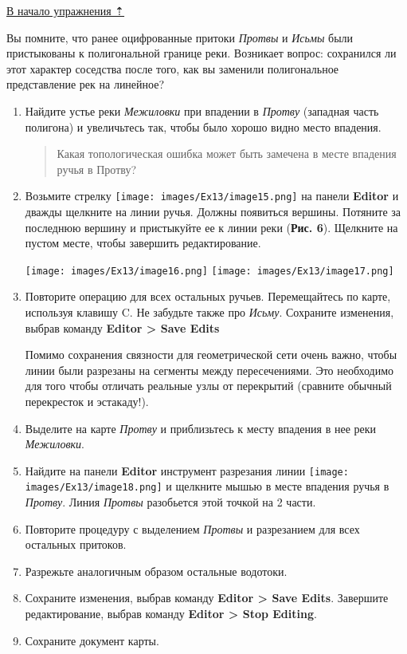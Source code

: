 \documentclass[12pt,]{book}
\begin{document}
\protect\hyperlink{network-hydro}{В начало упражнения ⇡}

Вы помните, что ранее оцифрованные притоки \emph{Протвы} и \emph{Исьмы} были пристыкованы к полигональной границе реки. Возникает вопрос: сохранился ли этот характер соседства после того, как вы заменили полигональное представление рек на линейное?

\begin{enumerate}
\def\labelenumi{\arabic{enumi}.}
\item
  Найдите устье реки \emph{Межиловки} при впадении в \emph{Протву} (западная часть полигона) и увеличьтесь так, чтобы было хорошо видно место впадения.

  \begin{quote}
  Какая топологическая ошибка может быть замечена в месте впадения ручья в Протву?
  \end{quote}
\item
  Возьмите стрелку \texttt{[image: images/Ex13/image15.png]} на панели \textbf{Editor} и дважды щелкните на линии ручья. Должны появиться вершины. Потяните за последнюю вершину и пристыкуйте ее к линии реки (\textbf{Рис. 6}). Щелкните на пустом месте, чтобы завершить редактирование.

  \texttt{[image: images/Ex13/image16.png]}
  \texttt{[image: images/Ex13/image17.png]}
\item
  Повторите операцию для всех остальных ручьев. Перемещайтесь по карте, используя клавишу C. Не забудьте также про \emph{Исьму}. Сохраните изменения, выбрав команду \textbf{Editor \textgreater{} Save Edits}

  Помимо сохранения связности для геометрической сети очень важно, чтобы линии были разрезаны на сегменты между пересечениями. Это необходимо для того чтобы отличать реальные узлы от перекрытий (сравните обычный перекресток и эстакаду!).
\item
  Выделите на карте \emph{Протву} и приблизьтесь к месту впадения в нее реки \emph{Межиловки}.
\item
  Найдите на панели \textbf{Editor} инструмент разрезания линии \texttt{[image: images/Ex13/image18.png]} и щелкните мышью в месте впадения ручья в \emph{Протву}. Линия \emph{Протвы} разобьется этой точкой на 2 части.
\item
  Повторите процедуру с выделением \emph{Протвы} и разрезанием для всех остальных притоков.
\item
  Разрежьте аналогичным образом остальные водотоки.
\item
  Сохраните изменения, выбрав команду \textbf{Editor \textgreater{} Save Edits}. Завершите редактирование, выбрав команду \textbf{Editor \textgreater{} Stop Editing}.
\item
  Сохраните документ карты.
\end{enumerate}
\end{document}

